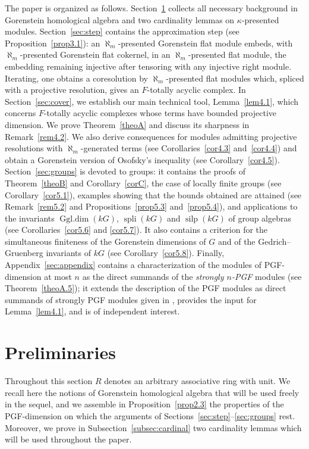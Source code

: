 \documentclass[12pt]{amsart}
\theoremstyle{remark}
\theoremstyle{definition}
\theoremstyle{plain}
\DeclareMathOperator{\spli}{spli}
\DeclareMathOperator{\silp}{silp}
\DeclareMathOperator{\Ggl}{Ggl.dim}
\newcommand{\alephm}{\aleph_m}
\begin{document}
The paper is organized as follows. Section~\ref{sec:prelim} collects all necessary background in Gorenstein homological algebra and two cardinality lemmas on $\kappa$-presented modules. Section~\ref{sec:step} contains the approximation step (see Proposition~\ref{prop3.1}): an $\alephm$-presented Gorenstein flat module embeds, with $\alephm$-presented Gorenstein flat cokernel, in an $\alephm$-presented flat module, the embedding remaining injective after tensoring with any injective right module. Iterating, one obtains a coresolution by $\alephm$-presented flat modules which, spliced with a projective resolution, gives an $F$-totally acyclic complex. In Section~\ref{sec:cover}, we establish our main technical tool, Lemma~\ref{lem4.1}, which concerns $F$-totally acyclic complexes whose terms have bounded projective dimension. We prove Theorem~\ref{theoA} and discuss its sharpness in Remark~\ref{rem4.2}. We also derive consequences for modules admitting projective resolutions with $\alephm$-generated terms
(see Corollaries~\ref{cor4.3} and~\ref{cor4.4})
and obtain a Gorenstein version of Osofsky's inequality
(see Corollary~\ref{cor4.5}). Section~\ref{sec:groups} is devoted to groups: it contains the proofs of Theorem~\ref{theoB} and Corollary~\ref{corC}, the case of locally finite groups (see Corollary~\ref{cor5.1}), examples showing that the bounds obtained are attained (see Remark~\ref{rem5.2} and Propositions~\ref{prop5.3} and~\ref{prop5.4}), and applications to the invariants $\Ggl(kG)$, $\spli(kG)$ and $\silp(kG)$ of group algebras (see Corollaries~\ref{cor5.6} and \ref{cor5.7}). It also contains a criterion for the simultaneous finiteness of the Gorenstein dimensions of $G$ and of the Gedrich--Gruenberg invariants of $kG$ (see Corollary~\ref{cor5.8}). Finally, Appendix~\ref{sec:appendix} contains a characterization of the modules of PGF-dimension at most $n$ as the direct summands of the \emph{strongly $n$-PGF} modules (see Theorem~\ref{theoA.5}); it extends the description of the PGF modules as direct summands of strongly PGF modules given in \cite{SS}, provides the input for Lemma~\ref{lem4.1}, and is of independent interest.

\section{Preliminaries}\label{sec:prelim}

Throughout this section $R$ denotes an arbitrary associative ring with unit. We recall here the notions of Gorenstein homological algebra that will be used freely in the sequel, and we assemble in Proposition~\ref{prop2.3} the properties of the PGF-dimension on which the arguments of Sections~\ref{sec:step}--\ref{sec:groups} rest. Moreover, we prove in Subsection~\ref{subsec:cardinal} two cardinality lemmas which will be used throughout the paper.
\end{document}
